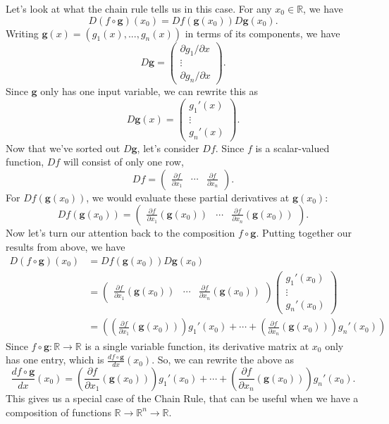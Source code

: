\documentclass{ximera}
\begin{document}
Let's look at what the chain rule tells us in this case. For any $x_0\in\mathbb{R}$, we have
\[ 
D(f\circ\mathbf{g})(x_0) = Df(\mathbf{g}(x_0))D\mathbf{g}(x_0).
\]
Writing $\mathbf{g}(x) = (g_1(x),...,g_n(x))$ in terms of its components, we have
\[
D\mathbf{g} = \left(\begin{array}{c}\partial g_1/\partial x\\ \vdots\\\partial g_n/\partial x\end{array}\right).
\]
Since $\mathbf{g}$ only has one input variable, we can rewrite this as
\[
D\mathbf{g}(x) = \left(\begin{array}{c}g_1'(x)\\ \vdots\\g_n'(x)\end{array}\right).
\]
Now that we've sorted out $D\mathbf{g}$, let's consider $Df$. Since $f$ is a scalar-valued function, $Df$ will consist of only one row,
\[
Df = \left(\begin{array}{ccc}\frac{\partial f}{\partial x_1} & \cdots & \frac{\partial f}{\partial x_n}\end{array}\right).
\]
For $Df(\mathbf{g}(x_0))$, we would evaluate these partial derivatives at $\mathbf{g}(x_0)$:
\[
Df(\mathbf{g}(x_0)) = \left(\begin{array}{ccc}\frac{\partial f}{\partial x_1}(\mathbf{g}(x_0)) & \cdots & \frac{\partial f}{\partial x_n}(\mathbf{g}(x_0))\end{array}\right).
\]
Now let's turn our attention back to the composition $f\circ\mathbf{g}$. Putting together our results from above, we have
\begin{align*}
D(f\circ\mathbf{g})(x_0) &= Df(\mathbf{g}(x_0))D\mathbf{g}(x_0)\\
&= \left(\begin{array}{ccc}\frac{\partial f}{\partial x_1}(\mathbf{g}(x_0)) & \cdots & \frac{\partial f}{\partial x_n}(\mathbf{g}(x_0))\end{array}\right)\left(\begin{array}{c}g_1'(x_0)\\ \vdots\\g_n'(x_0)\end{array}\right)\\
&=\left(\left(\frac{\partial f}{\partial x_1}(\mathbf{g}(x_0))\right)g_1'(x_0)+\cdots + \left(\frac{\partial f}{\partial x_n}(\mathbf{g}(x_0))\right)g_n'(x_0)\right)
\end{align*}
Since $f\circ\mathbf{g}:\mathbb{R}\rightarrow\mathbb{R}$ is a single variable function, its derivative matrix at $x_0$ only has one entry, which is $\frac{d f\circ\mathbf{g}}{dx}(x_0)$. So, we can rewrite the above as
\[
\frac{d f\circ\mathbf{g}}{dx}(x_0) = \left(\frac{\partial f}{\partial x_1}(\mathbf{g}(x_0))\right)g_1'(x_0)+\cdots + \left(\frac{\partial f}{\partial x_n}(\mathbf{g}(x_0))\right)g_n'(x_0).
\]
This gives us a special case of the Chain Rule, that can be useful when we have a composition of functions $\mathbb{R}\rightarrow\mathbb{R}^n\rightarrow\mathbb{R}$.
\end{document}
